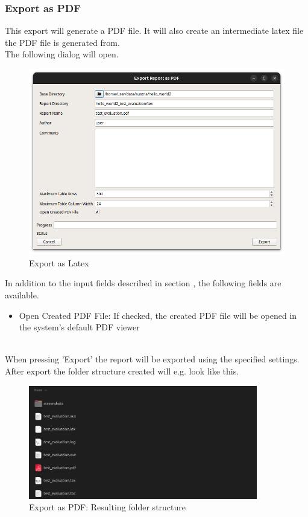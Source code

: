\subsubsection{Export as PDF}
\label{sec:report_export_pdf}

This export will generate a PDF file. It will also create an intermediate latex file the PDF file is generated from. \\

The following dialog will open.

\begin{figure}[H]
    \hspace*{-2.5cm}
    \center
    \includegraphics[width=12cm,frame]{figures/export_pdf.png}
  \caption{Export as Latex}
\end{figure}

In addition to the input fields described in section , 
the following fields are available.

\begin{itemize}  
    \item Open Created PDF File: If checked, the created PDF file will be opened in the system's default PDF viewer
\end{itemize}
\ \\

When pressing 'Export' the report will be exported using the specified settings.
After export the folder structure created will e.g. look like this.

\begin{figure}[H]
    \hspace*{-2.5cm}
    \center
    \includegraphics[width=10cm,frame]{figures/export_pdf_result.png}
  \caption{Export as PDF: Resulting folder structure}
\end{figure}


